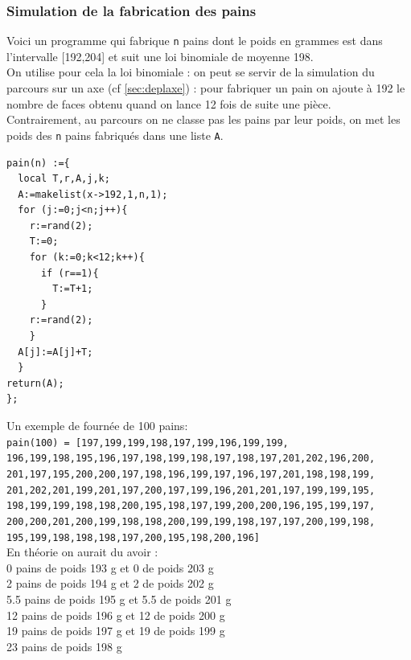 \documentclass[a4paper,11pt]{book}
\begin{document}
\subsubsection{Simulation de la fabrication des pains}
Voici un programme qui fabrique {\tt n} pains dont le  poids en grammes est 
dans l'intervalle [192,204] et suit une loi binomiale de moyenne 198.\\
On utilise pour cela la loi binomiale : on peut se servir de la simulation du 
parcours sur un axe 
(cf \ref{sec:deplaxe}) : pour fabriquer un pain on ajoute \`a 192 le nombre de 
faces obtenu quand on lance 12 fois de suite une pi\`ece.\\
Contrairement, au parcours on ne classe pas les pains par leur poids, on met 
les poids des {\tt n} pains fabriqu\'es dans une liste {\tt A}.   
\begin{verbatim}
pain(n) :={
  local T,r,A,j,k;
  A:=makelist(x->192,1,n,1);
  for (j:=0;j<n;j++){
    r:=rand(2); 
    T:=0;
    for (k:=0;k<12;k++){
      if (r==1){
        T:=T+1;
      }
    r:=rand(2);
    }
  A[j]:=A[j]+T;
  }
return(A);
}; 
\end{verbatim}
Un exemple de fourn\'ee de 100 pains:\\
{\tt pain(100) = [197,199,199,198,197,199,196,199,199,\\
     196,199,198,195,196,197,198,199,198,197,198,197,201,202,196,200,\\
     201,197,195,200,200,197,198,196,199,197,196,197,201,198,198,199,\\
     201,202,201,199,201,197,200,197,199,196,201,201,197,199,199,195,\\
     198,199,199,198,198,200,195,198,197,199,200,200,196,195,199,197,\\
     200,200,201,200,199,198,198,200,199,199,198,197,197,200,199,198,\\
     195,199,198,198,198,197,200,195,198,200,196]}\\
En th\'eorie on aurait du avoir :\\
0 pains de poids 193 g et 0 de poids 203 g\\
2 pains de poids 194 g et 2 de poids 202 g\\
5.5 pains de poids 195 g et 5.5 de poids 201 g\\
12 pains de poids 196 g et 12 de poids 200 g\\
19 pains de poids 197 g et 19 de poids 199 g\\
23 pains de poids 198 g \\
\end{document}
